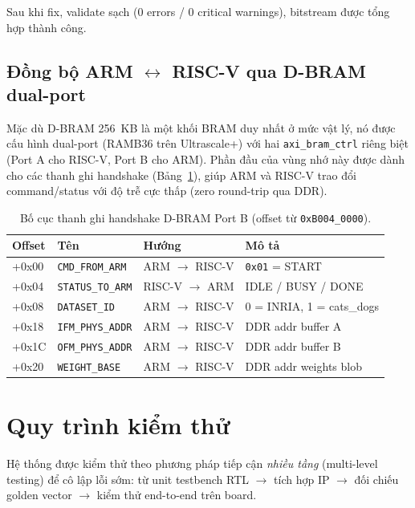 Sau khi fix, validate sạch (0 errors / 0 critical warnings), bitstream được tổng hợp thành công.

\newpage
\subsection{Đồng bộ ARM \(\leftrightarrow\) RISC-V qua D-BRAM dual-port}
Mặc dù D-BRAM 256~KB là một khối BRAM duy nhất ở mức vật lý, nó được cấu hình dual-port (RAMB36 trên Ultrascale+) với hai \texttt{axi\_bram\_ctrl} riêng biệt (Port A cho RISC-V, Port B cho ARM). Phần đầu của vùng nhớ này được dành cho các thanh ghi handshake (Bảng~\ref{tab:handshake-regs-ch5}), giúp ARM và RISC-V trao đổi command/status với độ trễ cực thấp (zero round-trip qua DDR).

\begin{table}[h]
    \centering
    \caption{Bố cục thanh ghi handshake D-BRAM Port B (offset từ \texttt{0xB004\_0000}).}
    \label{tab:handshake-regs-ch5}
    \begin{tabular}{|l|l|l|p{4.5cm}|}
        \hline
        \textbf{Offset} & \textbf{Tên} & \textbf{Hướng} & \textbf{Mô tả} \\ \hline
        +0x00 & \texttt{CMD\_FROM\_ARM}    & ARM $\to$ RISC-V & \texttt{0x01} = START \\ \hline
        +0x04 & \texttt{STATUS\_TO\_ARM}   & RISC-V $\to$ ARM & IDLE / BUSY / DONE \\ \hline
        +0x08 & \texttt{DATASET\_ID}       & ARM $\to$ RISC-V & 0 = INRIA, 1 = cats\_dogs \\ \hline
        +0x18 & \texttt{IFM\_PHYS\_ADDR}   & ARM $\to$ RISC-V & DDR addr buffer A \\ \hline
        +0x1C & \texttt{OFM\_PHYS\_ADDR}   & ARM $\to$ RISC-V & DDR addr buffer B \\ \hline
        +0x20 & \texttt{WEIGHT\_BASE}      & ARM $\to$ RISC-V & DDR addr weights blob \\ \hline
    \end{tabular}
\end{table}

\newpage
\section{Quy trình kiểm thử}
\label{sec:testing}

Hệ thống được kiểm thử theo phương pháp tiếp cận \textit{nhiều tầng} (multi-level testing) để cô lập lỗi sớm: từ unit testbench RTL $\to$ tích hợp IP $\to$ đối chiếu golden vector $\to$ kiểm thử end-to-end trên board.

